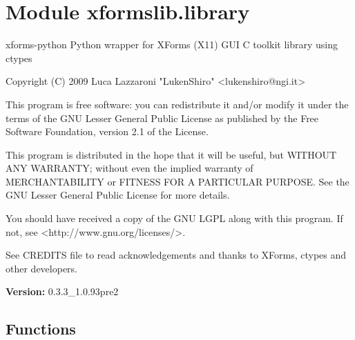 %
%
%


\section{Module xformslib.library}

    \label{xformslib:library}
xforms-python Python wrapper for XForms (X11) GUI C toolkit library using 
ctypes

Copyright (C) 2009  Luca Lazzaroni "LukenShiro"  
{\textless}lukenshiro@ngi.it{\textgreater}

This program is free software: you can redistribute it and/or modify it 
under the terms of the GNU Lesser General Public License as published by 
the Free Software Foundation, version 2.1 of the License.

This program is distributed in the hope that it will be useful, but WITHOUT
ANY WARRANTY; without even the implied warranty of MERCHANTABILITY or 
FITNESS FOR A PARTICULAR PURPOSE. See the GNU Lesser General Public License
for more details.

You should have received a copy of the GNU LGPL along with this program. If
not, see {\textless}http://www.gnu.org/licenses/{\textgreater}.

See CREDITS file to read acknowledgements and thanks to XForms, ctypes and 
other developers.

\textbf{Version:} 0.3.3\_1.0.93pre2





  \subsection{Functions}

    \label{xformslib:library:get_xforms_version}

